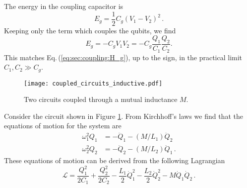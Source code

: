 
The energy in the coupling capacitor is
\begin{equation}
E_g = \frac{1}{2} C_g \left( V_1 - V_2 \right)^2 \, . \nonumber
\end{equation}
Keeping only the term which couples the qubits, we find \begin{equation}
E_g = -C_g V_1 V_2 = -C_g \frac{Q_1}{C_1} \frac{Q_2}{C_2} . \end{equation}
This matches Eq.\,(\ref{eq:sec:coupling:H_g}), up to the sign, in the practical limit $C_1,C_2 \gg C_g$.


\begin{figure}
\begin{centering}
\texttt{[image: coupled\_circuits\_inductive.pdf]}
\par\end{centering}
\caption{Two circuits coupled through a mutual inductance $M$.}
\label{Fig:coupledCircuits_inductive}
\end{figure}


Consider the circuit shown in Figure \ref{Fig:coupledCircuits_inductive}.
From Kirchhoff's laws we find that the equations of motion for the system are
\begin{align}
  \omega_1^2 Q_1 &= -\ddot{Q}_1 - \left(M/L_1\right) \ddot{Q}_2 \\
  \omega_2^2 Q_2 &= -\ddot{Q}_2 - \left(M/L_2\right) \ddot{Q}_1
  \, .
\end{align}
These equations of motion can be derived from the following Lagrangian
\begin{equation}
  \mathcal{L} = \frac{Q_1^2}{2 C_1} + \frac{Q_2^2}{2 C_2}
  - \frac{L_1}{2}\dot{Q}_1^2
  - \frac{L_2}{2}\dot{Q}_2^2
  - M \dot{Q}_1 \dot{Q}_2 \, . \label{eq:sec.coupling.subsec.inductiveCoupling:Lagrangian}
\end{equation}

